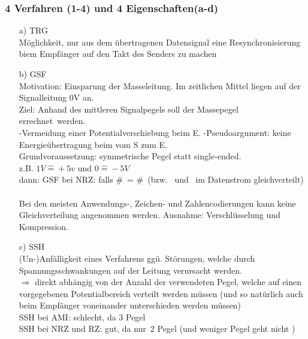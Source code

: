\documentclass[10pt,a4paper]{scrartcl}
\begin{document}
\subsubsection*{4 Verfahren (1-4) und 4 Eigenschaften(a-d)}

\begin{enumerate}
	\item[a)] \ac{TRG}\\
	Möglichkeit, nur aus dem übertragenen Datensignal eine Resynchronisierung biem Empfänger auf den Takt des Senders zu machen
	
	\item[b)] \ac{GSF} \\
	Motivation: Einsparung der Masseleitung. Im zeitlichen Mittel liegen auf der Signalleitung 0V an.\\
	Ziel: Anhand des mittleren Signalpegels soll der Massepegel \glqq errechnet\grqq\ werden.\\
	\subitem -Vermeidung einer Potentialverschiebung beim E.
	\subitem -Pseudoargument: keine Energieübertragung beim vom S zum E.\\
	Grundvoraussetzung: symmetrische Pegel statt single-ended. \\
	z.B. $1V \hat{=} +5v$ und $0 \hat{=} -5V$\\
	dann: \ac{GSF} bei \ac{NRZ}: falls \#\grqq\ = \#\grqq\ (bzw. \grqq\ und \grqq\ im Datenstrom gleichverteilt)\\\\
	Bei den meisten Anwendungs-, Zeichen- und Zahlencodierungen kann keine Gleichverteilung angenommen werden. Ausnahme: Verschlüsselung und Kompression.
	\item[c)] \ac{SSH}\\
	(Un-)Anfälligkeit eines Verfahrens ggü. Störungen, welche durch Spannungsschwankungen auf der Leitung verursacht werden.\\
	$\Rightarrow$ direkt abhängig von der Anzahl der verwendeten Pegel, welche auf einen vorgegebenen Potentialbereich verteilt werden müssen (und so natürlich auch beim Empfänger voneinander unterschieden werden müssen)\\
	\ac{SSH} bei \ac{AMI}: schlecht, da 3 Pegel\\
	\ac{SSH} bei \ac{NRZ} und \ac{RZ}: gut, da \glqq nur\grqq\ 2 Pegel (und weniger Pegel geht nicht \smiley{})
\end{enumerate}
\end{document}
